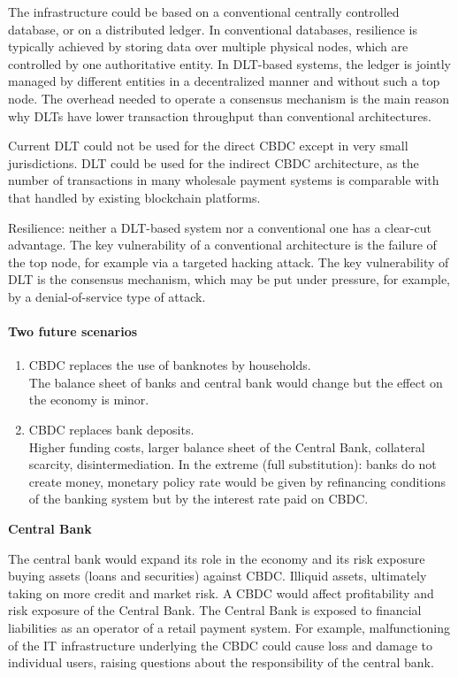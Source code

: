 The infrastructure could be based on a conventional centrally controlled database, or on a distributed ledger.
In conventional databases, resilience is typically achieved by storing data over multiple physical nodes, which are controlled by one authoritative entity.
In DLT-based systems, the ledger is jointly managed by different entities in a decentralized manner and without such a top node. The overhead needed to operate a consensus mechanism is the main reason why DLTs have lower transaction throughput than conventional architectures.

Current DLT could not be used for the direct CBDC except in very small jurisdictions. DLT could be used for the indirect CBDC architecture, as the number of transactions in many wholesale payment systems is comparable with that handled by existing blockchain platforms.

Resilience: neither a DLT-based system nor a conventional one has a clear-cut advantage. The key vulnerability of a conventional architecture is the failure of the top node, for example via a targeted hacking attack. The key vulnerability of DLT is the consensus mechanism, which may be put under pressure, for example, by a denial-of-service type of attack.

\paragraph{Two future scenarios}

\begin{enumerate}
    \item CBDC replaces the use of banknotes by households.\\
    The balance sheet of banks and central bank would change but the effect on the economy is minor.
    \item CBDC replaces bank deposits.\\
    Higher funding costs, larger balance sheet of the Central Bank, collateral scarcity, disintermediation. In the extreme (full substitution): banks do not create money, monetary policy rate would be given by refinancing conditions of the banking system but by the interest rate paid on CBDC.
\end{enumerate}

\textbf{Central Bank}

The central bank would expand its role in the economy and its risk exposure buying assets (loans and securities) against CBDC. Illiquid assets, ultimately taking on more credit and market risk.
A CBDC would affect profitability and risk exposure of the Central Bank. The Central Bank is exposed to financial liabilities as an operator of a retail payment system. For example, malfunctioning of the IT infrastructure underlying the CBDC could cause loss and damage to individual users, raising questions about the responsibility of the central bank.

